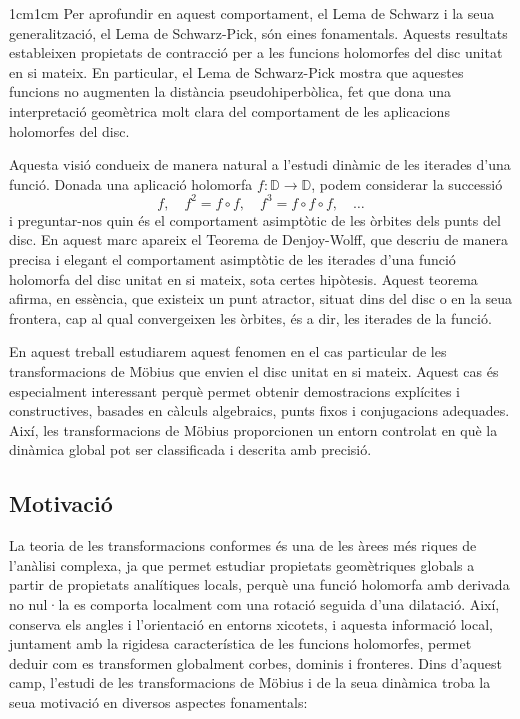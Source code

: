 \begin{adjustwidth}{1cm}{1cm}
Per aprofundir en aquest comportament, el Lema de Schwarz i la seua generalització, el Lema de Schwarz-Pick, són eines fonamentals. Aquests resultats estableixen propietats de contracció per a les funcions holomorfes del disc unitat en si mateix. En particular, el Lema de Schwarz-Pick mostra que aquestes funcions no augmenten la distància pseudohiperbòlica, fet que dona una interpretació geomètrica molt clara del comportament de les aplicacions holomorfes del disc.

Aquesta visió condueix de manera natural a l'estudi dinàmic de les iterades d'una funció. Donada una aplicació holomorfa $f:\mathbb{D}\to\mathbb{D}$, podem considerar la successió
\[
f, \quad f^2=f\circ f, \quad f^3=f\circ f\circ f, \quad \ldots
\]
i preguntar-nos quin és el comportament asimptòtic de les òrbites dels punts del disc. En aquest marc apareix el Teorema de Denjoy-Wolff, que descriu de manera precisa i elegant el comportament asimptòtic de les iterades d'una funció holomorfa del disc unitat en si mateix, sota certes hipòtesis. Aquest teorema afirma, en essència, que existeix un punt atractor, situat dins del disc o en la seua frontera, cap al qual convergeixen les òrbites, és a dir, les iterades de la funció.

En aquest treball estudiarem aquest fenomen en el cas particular de les transformacions de Möbius que envien el disc unitat en si mateix. Aquest cas és especialment interessant perquè permet obtenir demostracions explícites i constructives, basades en càlculs algebraics, punts fixos i conjugacions adequades. Així, les transformacions de Möbius proporcionen un entorn controlat en què la dinàmica global pot ser classificada i descrita amb precisió.

\subsection{Motivació}

La teoria de les transformacions conformes és una de les àrees més riques de l'anàlisi complexa, ja que permet estudiar propietats geomètriques globals a partir de propietats analítiques locals, perquè una funció holomorfa amb derivada no nul·la es comporta localment com una rotació seguida d'una dilatació. Així, conserva els angles i l'orientació en entorns xicotets, i aquesta informació local, juntament amb la rigidesa característica de les funcions holomorfes, permet deduir com es transformen globalment corbes, dominis i fronteres. Dins d'aquest camp, l'estudi de les transformacions de Möbius i de la seua dinàmica troba la seua motivació en diversos aspectes fonamentals:


\end{adjustwidth}
